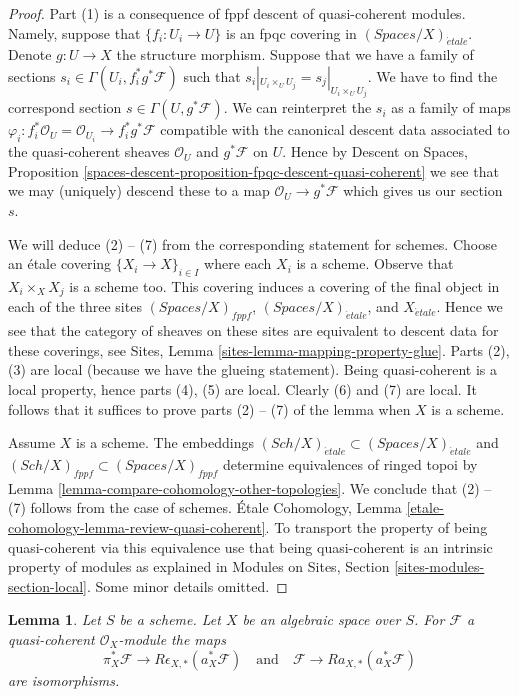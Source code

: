 \documentclass{stacks-project}
\theoremstyle{plain}
\newtheorem{lemma}[subsection]{Lemma}
\theoremstyle{definition}
\theoremstyle{remark}
\numberwithin{equation}{subsection}
\def\Sch{\mathit{Sch}}
\def\etale{{\acute{e}tale}}
\begin{document}
\begin{proof}
Part (1) is a consequence of fppf descent of quasi-coherent modules.
Namely, suppose that $\{f_i : U_i \to U\}$ is an fpqc covering
in $(\textit{Spaces}/X)_\etale$. Denote $g : U \to X$ the structure
morphism. Suppose that
we have a family of sections $s_i \in \Gamma(U_i , f_i^*g^*\mathcal{F})$
such that $s_i|_{U_i \times_U U_j} = s_j|_{U_i \times_U U_j}$.
We have to find the correspond section $s \in \Gamma(U, g^*\mathcal{F})$.
We can reinterpret the $s_i$ as a family of maps
$\varphi_i : f_i^*\mathcal{O}_U = \mathcal{O}_{U_i} \to f_i^*g^*\mathcal{F}$
compatible with the canonical descent data associated to the
quasi-coherent sheaves $\mathcal{O}_U$ and $g^*\mathcal{F}$ on $U$.
Hence by Descent on Spaces, Proposition
\ref{spaces-descent-proposition-fpqc-descent-quasi-coherent}
we see that we may (uniquely) descend
these to a map $\mathcal{O}_U \to g^*\mathcal{F}$ which gives
us our section $s$.

\medskip\noindent
We will deduce (2) -- (7) from the corresponding statement for schemes.
Choose an \'etale covering $\{X_i \to X\}_{i \in I}$
where each $X_i$ is a scheme. Observe that $X_i \times_X X_j$
is a scheme too. This covering induces a covering of
the final object in each of the three sites
$(\textit{Spaces}/X)_{fppf}$, $(\textit{Spaces}/X)_\etale$, and $X_\etale$.
Hence we see that the category of sheaves on these sites
are equivalent to descent data for these coverings, see
Sites, Lemma \ref{sites-lemma-mapping-property-glue}.
Parts (2), (3) are local (because we have the glueing statement).
Being quasi-coherent is a local property, hence parts
(4), (5) are local. Clearly (6) and (7) are local.
It follows that it suffices to prove parts (2) -- (7)
of the lemma when $X$ is a scheme.

\medskip\noindent
Assume $X$ is a scheme. The embeddings
$(\Sch/X)_\etale \subset (\textit{Spaces}/X)_\etale$ and
$(\Sch/X)_{fppf} \subset (\textit{Spaces}/X)_{fppf}$
determine equivalences of ringed topoi by
Lemma \ref{lemma-compare-cohomology-other-topologies}.
We conclude that (2) -- (7) follows from the case of schemes.
\'Etale Cohomology, Lemma
\ref{etale-cohomology-lemma-review-quasi-coherent}.
To transport the property of being quasi-coherent via
this equivalence use that being quasi-coherent is an
intrinsic property of modules as explained in
Modules on Sites, Section \ref{sites-modules-section-local}.
Some minor details omitted.
\end{proof}

\begin{lemma}
\label{lemma-cohomological-descent-etale-fppf-modules}
Let $S$ be a scheme. Let $X$ be an algebraic space over $S$.
For $\mathcal{F}$ a quasi-coherent $\mathcal{O}_X$-module the maps
$$
\pi_X^*\mathcal{F} \longrightarrow R\epsilon_{X, *}(a_X^*\mathcal{F})
\quad\text{and}\quad
\mathcal{F} \longrightarrow Ra_{X, *}(a_X^*\mathcal{F})
$$
are isomorphisms.
\end{lemma}
\end{document}
